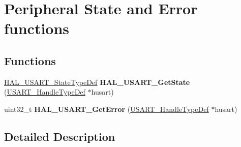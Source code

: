 \hypertarget{group___u_s_a_r_t___exported___functions___group3}{}\section{Peripheral State and Error functions}
\label{group___u_s_a_r_t___exported___functions___group3}
\subsection*{Functions}
\begin{DoxyCompactItemize}
\item 
\mbox{\label{group___u_s_a_r_t___exported___functions___group3_ga4fd7b79a07f70c5c9b4d13b7aaf147e8}} 
\hyperlink{group___u_s_a_r_t___exported___types_ga502e7abdfa6b24f0f6b40cf60c7383c5}{H\+A\+L\+\_\+\+U\+S\+A\+R\+T\+\_\+\+State\+Type\+Def} {\bfseries H\+A\+L\+\_\+\+U\+S\+A\+R\+T\+\_\+\+Get\+State} (\hyperlink{struct_u_s_a_r_t___handle_type_def}{U\+S\+A\+R\+T\+\_\+\+Handle\+Type\+Def} $\ast$husart)
\item 
\mbox{\label{group___u_s_a_r_t___exported___functions___group3_ga0a6ae309b21478da71f41cbc2b72fc47}} 
uint32\+\_\+t {\bfseries H\+A\+L\+\_\+\+U\+S\+A\+R\+T\+\_\+\+Get\+Error} (\hyperlink{struct_u_s_a_r_t___handle_type_def}{U\+S\+A\+R\+T\+\_\+\+Handle\+Type\+Def} $\ast$husart)
\end{DoxyCompactItemize}


\subsection{Detailed Description}
